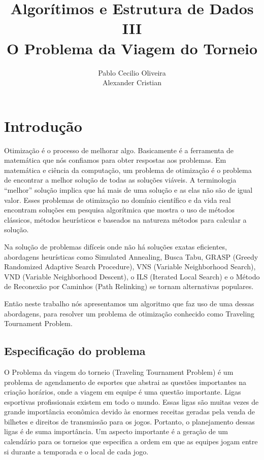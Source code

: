 \documentclass[12pt,a4paper]{article}
\author{Pablo Cecilio Oliveira\\
	Alexander Cristian}
\title{Algorítimos e Estrutura de Dados III\\
O Problema da Viagem do Torneio}
\date{}
\begin{document}
\maketitle

\section{Introdução}

Otimização é o processo de melhorar algo. Basicamente é a ferramenta de matemática que nós confiamos para obter respostas aos problemas. Em matemática e ciência da computação, um problema de otimização é o problema de encontrar a melhor solução de todas as soluções viáveis. A terminologia “melhor” solução implica que há mais de uma solução e as elas não são de igual valor. Esses problemas de otimização no domínio científico e da vida real encontram soluções em pesquisa algorítmica que mostra o uso de métodos clássicos, métodos heurísticos e baseados na natureza métodos para calcular a solução.

Na solução de problemas difíceis onde não há soluções exatas eficientes, abordagens heurísticas como Simulated Annealing, Busca Tabu, GRASP (Greedy Randomized Adaptive Search Procedure), VNS (Variable Neighborhood Search), VND (Variable Neighborhood Descent), o ILS (Iterated Local Search) e o Método de Reconexão por Caminhos (Path Relinking) se tornam alternativas populares.

Então neste trabalho nós apresentamos um algoritmo que faz uso de uma dessas abordagens, para resolver um problema de otimização conhecido como Traveling Tournament Problem.


\subsection{Especificação do problema}

O Problema da viagem do torneio (Traveling Tournament Problem) é um problema de agendamento de esportes que abstrai as questões importantes na criação horários, onde a viagem em equipe é uma questão importante. Ligas esportivas profissionais existem em todo o mundo. Essas ligas são muitas vezes de grande importância econômica devido às enormes receitas geradas pela venda de bilhetes e direitos de transmissão para os jogos. Portanto, o planejamento dessas ligas é de suma importância. Um aspecto importante é a geração de um calendário para os torneios que especifica a ordem em que as equipes jogam entre si durante a temporada e o local de cada jogo. 
\end{document}
